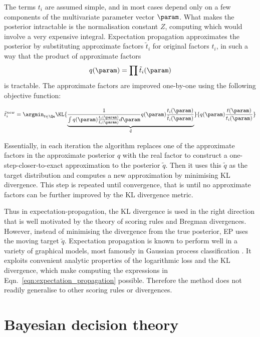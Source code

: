 The terms $t_i$ are assumed simple, and in most cases depend only on a few components of the multivariate parameter vector $\param$. What makes the posterior intractable is the normalisation constant $Z$, computing which would involve a very expensive integral. Expectation propagation approximates the posterior by substituting approximate factors $\tilde{t}_i$ for original factors $t_i$, in such a way that the product of approximate factors
\begin{equation}
	q(\param) = \prod \tilde{t}_i(\param)
\end{equation}
is tractable. The approximate factors are improved one-by-one using the following objective function:

\begin{equation}
	\tilde{t}_i^{new} = \argmin_{t \in \Qe} \KL{\underbrace{\frac{1}{\int q(\param)\frac{t_i(\param)}{\tilde{t}_i(\param)} d\param}q(\param)\frac{t_i(\param)}{\tilde{t}_i(\param)}}_{\tilde{q}}}{q(\param)\frac{t(\param)}{t_i(\param)}} \label{eqn:expectation_propagation}
\end{equation}

Essentially, in each iteration the algorithm replaces one of the approximate factors in the approximate posterior $q$ with the real factor to construct a one-step-closer-to-exact approximation to the posterior $\tilde{q}$. Then it uses this $\tilde{q}$ as the target distribution and computes a new approximation by minimising KL divergence. This step is repeated until convergence, that is until no approximate factors can be further improved by the KL divergence metric.

Thus in expectation-propagation, the KL divergence is used in the right direction that is well motivated by the theory of scoring rules and Bregman divergences. However, instead of minimising the divergence from the true posterior, EP uses the moving target $\tilde{q}$. Expectation propagation is known to perform well in a variety of graphical models, most famously in Gaussian process classification \citep{Nickisch2008}. It exploits convenient analytic properties of the logarithmic loss and the KL divergence, which make computing the expressions in Eqn.\ \eqref{eqn:expectation_propagation} possible. Therefore the method does not readily generalise to other scoring rules or divergences.

\section{Bayesian decision theory}

